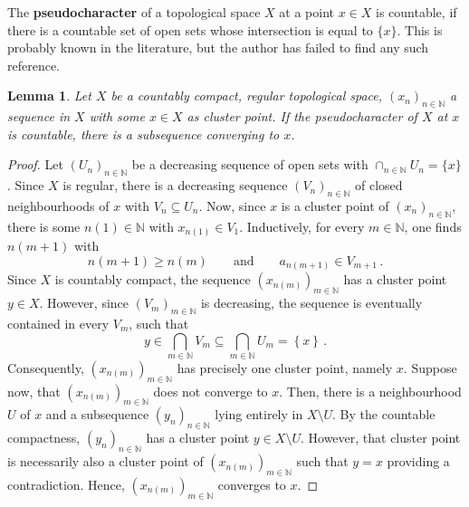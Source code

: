 \documentclass[
	paper=A4,
	pagesize=auto,
	fontsize=12pt
]{scrartcl}
\theoremstyle{plain}
\newtheorem{lemma}[theorem]{Lemma}
\theoremstyle{remark}
\theoremstyle{definition}
\begin{document}
The \textbf{pseudocharacter} of a topological space $X$ at a point $x \in X$ is countable, if there is a countable set of open sets whose intersection is equal to $\{ x \}$.
This  is probably known in the literature, but the author has failed to find any such reference.
%
\begin{lemma}
\label{lem:CountabilityAndPseudocharacter}
Let $X$ be a countably compact, regular topological space, $(x_n)_{n \in \mathbb{N}}$ a sequence in $X$ with some $x \in X$ as cluster point.
If the pseudocharacter of $X$ at $x$ is countable, there is a subsequence converging to $x$.
\end{lemma}
\begin{proof}
Let $(U_n)_{n \in \mathbb{N}}$ be a decreasing sequence of open sets with $\cap_{n \in \mathbb{N}} U_n = \{ x \}$.
Since $X$ is regular, there is a decreasing sequence $(V_n)_{n \in \mathbb{N}}$ of closed neighbourhoods of $x$ with $V_n \subseteq U_n$.
Now, since $x$ is a cluster point of $(x_n)_{n \in \mathbb{N}}$, there is some $n(1) \in \mathbb{N}$ with $x_{n(1)} \in V_1$.
Inductively, for every $m \in \mathbb{N}$, one finds $n(m+1)$ with
%
\begin{equation}
n \left( m + 1 \right) \ge n \left( m \right)
\qquad\text{and}\qquad
a_{n (m+1)} \in V_{m + 1} \, .
\end{equation}
%
Since $X$ is countably compact, the sequence $(x_{n(m)})_{m \in \mathbb{N}}$ has a cluster point $y \in X$.
However, since $(V_m)_{m \in \mathbb{N}}$ is decreasing, the sequence is eventually contained in every $V_m$, such that
%
\begin{equation}
y \in \bigcap_{m \in \mathbb{N}} V_m \subseteq \bigcap_{m \in \mathbb{N}} U_m = \left\{ x \right\} \, .
\end{equation}
%
Consequently, $(x_{n(m)})_{m \in \mathbb{N}}$ has precisely one cluster point, namely $x$.
Suppose now, that $(x_{n(m)})_{m \in \mathbb{N}}$ does not converge to $x$.
Then, there is a neighbourhood $U$ of $x$ and a subsequence $(y_n)_{n \in \mathbb{N}}$ lying entirely in $X \setminus U$.
By the countable compactness, $(y_n)_{n \in \mathbb{N}}$ has a cluster point $y \in X \setminus U$.
However, that cluster point is necessarily also a cluster point of $(x_{n(m)})_{m \in \mathbb{N}}$ such that $y = x$ providing a contradiction.
Hence, $(x_{n(m)})_{m \in \mathbb{N}}$ converges to $x$.
\end{proof}
%
\end{document}
